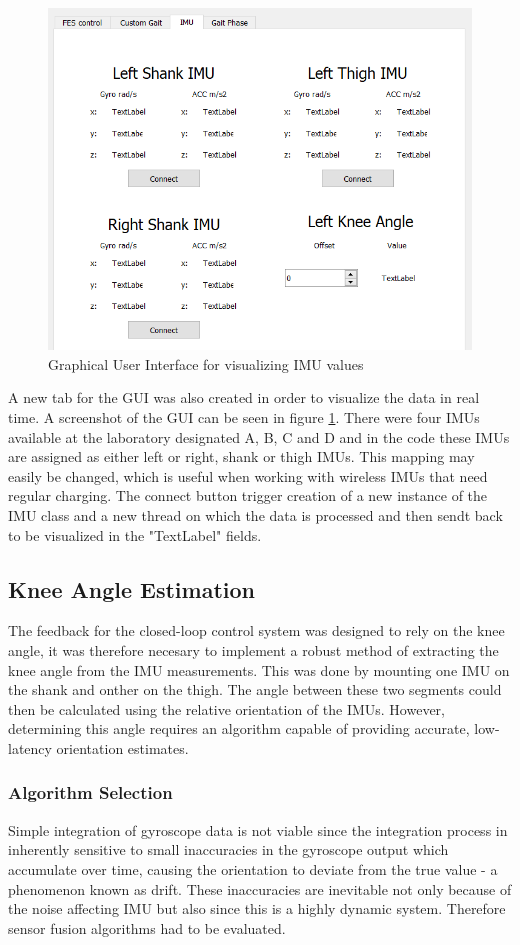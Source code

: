 \begin{figure} [h]
    \centering
    \includegraphics[width=0.7\linewidth]{images/imugui1.png}
    \caption{Graphical User Interface for visualizing IMU values}
    \label{fig:imugui}
\end{figure}

A new tab for the GUI was also created in order to visualize the data in real time. A screenshot of the GUI can be seen in figure \ref{fig:imugui}. There were four IMUs available at the laboratory designated A, B, C and D and in the code these IMUs are assigned as either left or right, shank or thigh IMUs. This mapping may easily be changed, which is useful when working with wireless IMUs that need regular charging. The connect button trigger creation of a new instance of the IMU class and a new thread on which the data is processed and then sendt back to be visualized in the "TextLabel" fields.

\subsection{Knee Angle Estimation}
The feedback for the closed-loop control system was designed to rely on the knee angle, it was therefore necesary to implement a robust method of extracting the knee angle from the IMU measurements. This was done by mounting one IMU on the shank and onther on the thigh. The angle between these two segments could then be calculated using the relative orientation of the IMUs. However, determining this angle requires an algorithm capable of providing accurate, low-latency orientation estimates. 


\subsubsection{Algorithm Selection}
Simple integration of gyroscope data is not viable since the integration process in inherently sensitive to small inaccuracies in the gyroscope output which accumulate over time, causing the orientation to deviate from the true value - a phenomenon known as drift. These inaccuracies are inevitable not only because of the noise affecting IMU but also since this is a highly dynamic system. Therefore sensor fusion algorithms had to be evaluated.

